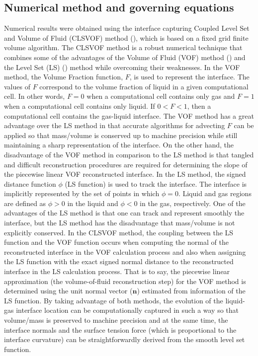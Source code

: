 \documentclass{elsarticle}
\begin{document}
\subsection{Numerical method and governing equations}
Numerical results were obtained using the interface capturing Coupled Level Set and Volume of Fluid (CLSVOF) method (\citet{SusPuc00,SusSmiHusOhtZhi07}), which is based on a fixed grid finite volume algorithm.  The CLSVOF method is a robust  numerical  technique that  combines  some  of  the  advantages  of the Volume of Fluid (VOF) method (\citet{HirNic81}) and the Level Set (LS) (\citet{SusSmeOsh94}) method while overcoming their weaknesses.  In the VOF method,  the Volume Fraction function, $F$, is used to represent the interface. The values of $F$ correspond to the volume fraction of liquid in a given computational cell.  In other words, $F = 0$ when a computational cell contains only gas and $F = 1$ when a computational cell contains only liquid.  If $0 < F < 1$, then a computational cell contains the gas-liquid interface. The VOF method has a great advantage over the LS method in that accurate algorithms for advecting $F$ can be applied so that mass/volume is conserved up to machine precision while still maintaining a sharp representation of the interface.  On the other hand, the disadvantage of the VOF method in comparison to the LS method is that tangled and difficult reconstruction procedures are required for determining the slope of the piecewise linear VOF reconstructed interface.  In the LS method, the signed distance function $\phi$ (LS function) is used to track the interface. The interface is implicitly represented by the set of points in which $\phi = 0$.  Liquid and gas regions are defined as $\phi > 0$ in the liquid and $\phi < 0$ in the gas, respectively.  One of the advantages of the LS method is that one can track and represent smoothly the interface, but the LS method has the disadvantage that mass/volume is not explicitly conserved.  In the CLSVOF method, the coupling between the LS function and the VOF function occurs when computing the normal of the reconstructed interface in the VOF calculation process and also when assigning the LS function with the exact signed normal distance to the reconstructed interface in the LS calculation process. That is to say, the piecewise linear approximation (the volume-of-fluid reconstruction step) for the VOF method is determined using the unit normal vector ($\bm n$) estimated from information of the LS function. By taking advantage of both methods, the evolution of the liquid-gas interface location can be computationally captured in such a way so that volume/mass is preserved to machine precision and at the same time, the interface normals and the surface tension force (which is proportional to the interface curvature) can be straightforwardly derived from the smooth level set function.
\end{document}
